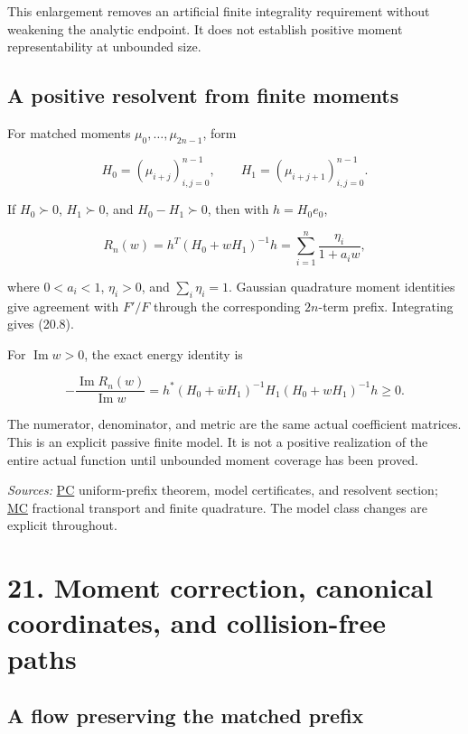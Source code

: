 \documentclass[
  10pt,
  a4paper,
  10pt,
  oneside,
  openany]{book}
\begin{document}
This enlargement removes an artificial finite integrality requirement
without weakening the analytic endpoint. It does not establish positive
moment representability at unbounded size.

\subsection{A positive resolvent from finite
moments}\label{a-positive-resolvent-from-finite-moments}

For matched moments \(\mu_0,\ldots,\mu_{2n-1}\), form

\[
H_0=(\mu_{i+j})_{i,j=0}^{n-1},
\qquad H_1=(\mu_{i+j+1})_{i,j=0}^{n-1}.
\tag{20.11}\label{eq:20.11}
\]

If \(H_0\succ0\), \(H_1\succ0\), and \(H_0-H_1\succ0\), then with
\(h=H_0e_0\),

\[
R_n(w)=h^T(H_0+wH_1)^{-1}h
=\sum_{i=1}^n\frac{\eta_i}{1+a_iw},
\tag{20.12}\label{eq:20.12}
\]

where \(0<a_i<1\), \(\eta_i>0\), and \(\sum_i\eta_i=1\). Gaussian
quadrature moment identities give agreement with \(F'/F\) through the
corresponding \(2n\)-term prefix. Integrating gives (20.8).

For \(\operatorname{Im}w>0\), the exact energy identity is

\[
-\frac{\operatorname{Im}R_n(w)}{\operatorname{Im}w}
=h^*(H_0+\overline wH_1)^{-1}
H_1(H_0+wH_1)^{-1}h\ge0.
\tag{20.13}\label{eq:20.13}
\]

The numerator, denominator, and metric are the same actual coefficient
matrices. This is an explicit passive finite model. It is not a positive
realization of the entire actual function until unbounded moment
coverage has been proved.

\emph{Sources:} \hyperref[source-pc]{PC} uniform-prefix theorem, model
certificates, and resolvent section; \hyperref[source-mc]{MC} fractional
transport and finite quadrature. The model class changes are explicit
throughout.

\section{21. Moment correction, canonical coordinates, and
collision-free paths}\label{ch-continuation}

\subsection{A flow preserving the matched
prefix}\label{a-flow-preserving-the-matched-prefix}
\end{document}

